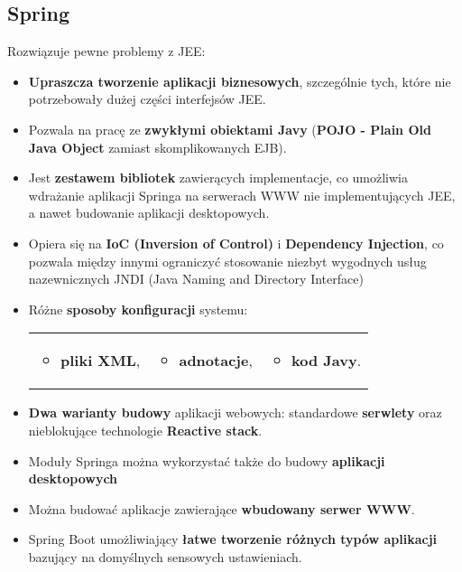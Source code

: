 \documentclass[../main.tex]{subfiles}
\begin{document}
    \subsection{Spring}
    Rozwiązuje pewne problemy z JEE:
    \begin{itemize}
        \item \textbf{Upraszcza tworzenie aplikacji biznesowych}, szczególnie tych, które nie
        potrzebowały dużej części interfejsów JEE.
        \item Pozwala na pracę ze \textbf{zwykłymi obiektami Javy} (\textbf{POJO - Plain Old Java
        Object} zamiast skomplikowanych EJB).
        \item Jest \textbf{zestawem bibliotek} zawierących implementacje, co umożliwia
        wdrażanie aplikacji Springa na serwerach WWW nie implementujących
        JEE, a nawet budowanie aplikacji desktopowych.
        \item Opiera się na \textbf{IoC (Inversion of Control)} i \textbf{Dependency Injection}, co
        pozwala między innymi ograniczyć stosowanie niezbyt wygodnych usług
        nazewnicznych JNDI (Java Naming and Directory Interface)
        \item Różne \textbf{sposoby konfiguracji} systemu:
        \begin{table}[H]
            \begin{center}
                \begin{tabular}{p{5cm} p{5cm} p{5cm}}
                    \begin{itemize}
                        \item \textbf{pliki XML},
                    \end{itemize}
                    &
                    \begin{itemize}
                        \item \textbf{adnotacje},
                    \end{itemize}
                    &
                    \begin{itemize}
                        \item \textbf{kod Javy}.
                    \end{itemize}
                \end{tabular}
            \end{center}
        \end{table}
        \item \textbf{Dwa warianty budowy} aplikacji webowych: standardowe \textbf{serwlety} oraz nieblokujące technologie \textbf{Reactive stack}.
        \item Moduły Springa można wykorzystać także do budowy \textbf{aplikacji desktopowych}
        \item Można budować aplikacje zawierające \textbf{wbudowany serwer WWW}.
        \item Spring Boot umożliwiający \textbf{łatwe tworzenie różnych typów aplikacji} bazujący
        na domyślnych sensowych ustawieniach.
    \end{itemize}
\end{document}
